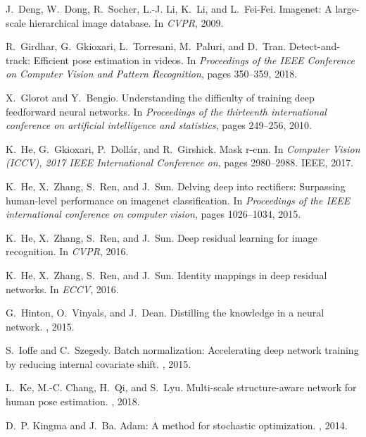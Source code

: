 \documentclass[10pt,twocolumn,letterpaper]{article}
\begin{document}
{\begin{thebibliography}{10}
J.~Deng, W.~Dong, R.~Socher, L.-J. Li, K.~Li, and L.~Fei-Fei.
\newblock Imagenet: A large-scale hierarchical image database.
\newblock In {\em CVPR}, 2009.

R.~Girdhar, G.~Gkioxari, L.~Torresani, M.~Paluri, and D.~Tran.
\newblock Detect-and-track: Efficient pose estimation in videos.
\newblock In {\em Proceedings of the IEEE Conference on Computer Vision and
  Pattern Recognition}, pages 350--359, 2018.

X.~Glorot and Y.~Bengio.
\newblock Understanding the difficulty of training deep feedforward neural
  networks.
\newblock In {\em Proceedings of the thirteenth international conference on
  artificial intelligence and statistics}, pages 249--256, 2010.

K.~He, G.~Gkioxari, P.~Doll{\'a}r, and R.~Girshick.
\newblock Mask r-cnn.
\newblock In {\em Computer Vision (ICCV), 2017 IEEE International Conference
  on}, pages 2980--2988. IEEE, 2017.

K.~He, X.~Zhang, S.~Ren, and J.~Sun.
\newblock Delving deep into rectifiers: Surpassing human-level performance on
  imagenet classification.
\newblock In {\em Proceedings of the IEEE international conference on computer
  vision}, pages 1026--1034, 2015.

K.~He, X.~Zhang, S.~Ren, and J.~Sun.
\newblock Deep residual learning for image recognition.
\newblock In {\em CVPR}, 2016.

K.~He, X.~Zhang, S.~Ren, and J.~Sun.
\newblock Identity mappings in deep residual networks.
\newblock In {\em ECCV}, 2016.

G.~Hinton, O.~Vinyals, and J.~Dean.
\newblock Distilling the knowledge in a neural network.
, 2015.

S.~Ioffe and C.~Szegedy.
\newblock Batch normalization: Accelerating deep network training by reducing
  internal covariate shift.
, 2015.

L.~Ke, M.-C. Chang, H.~Qi, and S.~Lyu.
\newblock Multi-scale structure-aware network for human pose estimation.
, 2018.

D.~P. Kingma and J.~Ba.
\newblock Adam: A method for stochastic optimization.
, 2014.


\end{thebibliography}}
\end{document}
